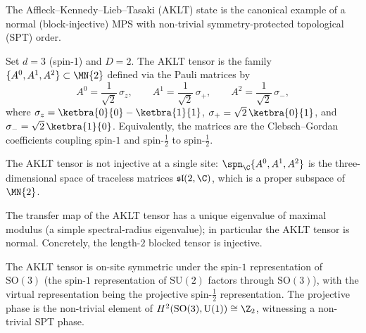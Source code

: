 The Affleck--Kennedy--Lieb--Tasaki (AKLT) state is the canonical
example of a normal (block-injective) MPS with non-trivial
symmetry-protected topological (SPT) order.

\begin{definition}\label{def:aklt_tensor}
    \notready
    Set $d = 3$ (spin-1) and $D = 2$.  The AKLT tensor is the family
    $\{A^0, A^1, A^2\} \subset \MN{2}$ defined via the Pauli matrices by
    \[
        A^0 = \frac{1}{\sqrt{2}}\,\sigma_z,
        \qquad
        A^1 = \frac{1}{\sqrt{2}}\,\sigma_+,
        \qquad
        A^2 = \frac{1}{\sqrt{2}}\,\sigma_-,
    \]
    where
    $\sigma_z = \ketbra{0}{0} - \ketbra{1}{1}$,
    $\sigma_+ = \sqrt{2}\,\ketbra{0}{1}$, and
    $\sigma_- = \sqrt{2}\,\ketbra{1}{0}$.
    Equivalently, the matrices are the Clebsch--Gordan coefficients
    coupling spin-$1$ and spin-$\tfrac12$ to spin-$\tfrac12$.
\end{definition}

\begin{theorem}\label{thm:aklt_not_injective}
    \notready
    The AKLT tensor is not injective at a single site:
    $\spn_{\C}\{A^0, A^1, A^2\}$ is the three-dimensional space of
    traceless matrices $\mathfrak{sl}(2,\C)$, which is a proper
    subspace of~$\MN{2}$.
\end{theorem}

\begin{theorem}\label{thm:aklt_normal}
    \notready
    The transfer map of the AKLT tensor has a unique eigenvalue of
    maximal modulus (a simple spectral-radius eigenvalue); in
    particular the AKLT tensor is normal.  Concretely, the
    length-$2$ blocked tensor is injective.
\end{theorem}

\begin{theorem}\label{thm:aklt_so3_symmetric}
    \notready
    The AKLT tensor is on-site symmetric under the spin-$1$
    representation of $\mathrm{SO}(3)$ (the spin-$1$ representation
    of $\mathrm{SU}(2)$ factors through $\mathrm{SO}(3)$), with the
    virtual representation being the projective spin-$\tfrac12$
    representation.  The projective phase is the non-trivial
    element of $H^2(\mathrm{SO}(3),\mathrm{U}(1)) \cong \Z_2$,
    witnessing a non-trivial SPT phase.
\end{theorem}

